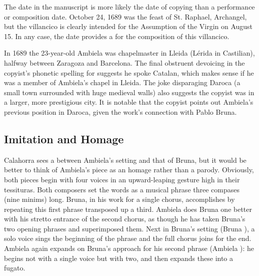The date in the manuscript is more likely the date of copying than a performance or composition date.
October 24, 1689 was the feast of St. Raphael, Archangel, but the villancico is clearly intended for the Assumption of the Virgin on August 15.
In any case, the date provides a  for the composition of this villancico.

In 1689 the 23-year-old Ambiela was chapelmaster in Lleida (Lérida in Castilian), halfway between Zaragoza and Barcelona.
The final obstruent devoicing in the copyist's phonetic spelling  for  suggests he spoke Catalan, which makes sense if he was a member of Ambiela's chapel in Lleida.
The joke disparaging Daroca (a small town surrounded with huge medieval walls) also suggests the copyist was in a larger, more prestigious city.
It is notable that the copyist points out Ambiela's previous position in Daroca, given the work's connection with Pablo Bruna.

\subsection{Imitation and Homage}

Calahorra sees a  between Ambiela's setting and that of Bruna, but it would be better to think of Ambiela's piece as an homage rather than a parody.
	\autocite[18]{Calahorra:Suban}
Obviously, both pieces begin with four voices in an upward-leaping gesture high in their tessituras.
Both composers set the words  as a musical phrase three compases (nine minims) long.
Bruna, in his work for a single chorus, accomplishes  by repeating this first phrase transposed up a third.
Ambiela does Bruna one better with his stretto entrance of the second chorus, as though he has taken Bruna's two opening phrases and superimposed them.
Next in Bruna's setting (Bruna ), a solo voice sings the beginning of the phrase and the full chorus joins for the end. 
Ambiela again expands on Bruna's approach for his second phrase (Ambiela ): he begins not with a single voice but with two, and then expands these into a fugato.

